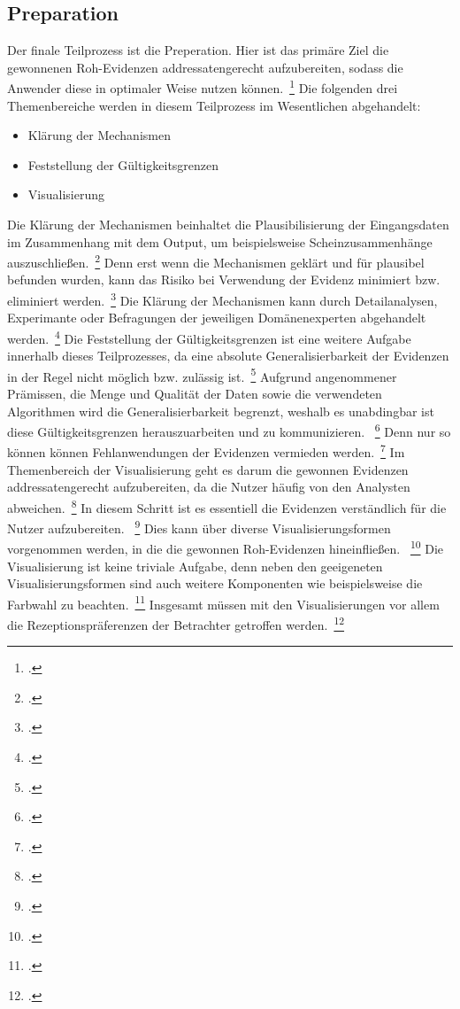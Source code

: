 \subsection{Preparation} \label{sec: t_Preparation}

Der finale Teilprozess ist die Preperation. Hier ist das primäre Ziel die gewonnenen Roh-Evidenzen addressatengerecht
aufzubereiten, sodass die Anwender diese in optimaler Weise nutzen können.~\footcite[\vglf][]{seiter.2019}
Die folgenden drei Themenbereiche werden in diesem Teilprozess im Wesentlichen abgehandelt:
\begin{itemize}
    \item Klärung der Mechanismen
    \item Feststellung der Gültigkeitsgrenzen
    \item Visualisierung
\end{itemize}
Die Klärung der Mechanismen beinhaltet die Plausibilisierung der Eingangsdaten im Zusammenhang mit dem Output, um beispielsweise
Scheinzusammenhänge auszuschließen.~\footcite[\vglf][-32]{seiter.2019}
Denn erst wenn die Mechanismen geklärt und für plausibel befunden wurden, kann das Risiko bei Verwendung der Evidenz
minimiert bzw. eliminiert werden.~\footcite[\vglf][-32]{seiter.2019}
Die Klärung der Mechanismen kann durch Detailanalysen, Experimante oder Befragungen der jeweiligen Domänenexperten
abgehandelt werden.~\footcite[\vglf][]{seiter.2019}
Die Feststellung der Gültigkeitsgrenzen ist eine weitere Aufgabe innerhalb dieses Teilprozesses, da eine absolute
Generalisierbarkeit der Evidenzen in der Regel nicht möglich bzw. zulässig ist.~\footcite[\vglf][]{seiter.2019}
Aufgrund angenommener Prämissen, die Menge und Qualität der Daten sowie die verwendeten Algorithmen wird die
Generalisierbarkeit begrenzt, weshalb es unabdingbar ist diese Gültigkeitsgrenzen herauszuarbeiten und zu kommunizieren.
~\footcite[\vglf][]{seiter.2019}
Denn nur so können können Fehlanwendungen der Evidenzen vermieden werden.~\footcite[\vglf][]{seiter.2019}
Im Themenbereich der Visualisierung geht es darum die gewonnen Evidenzen addressatengerecht aufzubereiten, da die
Nutzer häufig von den Analysten abweichen.~\footcite[\vglf][]{seiter.2019}
In diesem Schritt ist es essentiell die Evidenzen verständlich für die Nutzer aufzubereiten.
~\footcite[\vglf][]{seiter.2019}
Dies kann über diverse Visualisierungsformen vorgenommen werden, in die die gewonnen Roh-Evidenzen hineinfließen.
~\footcite[\vglf][]{seiter.2019}
Die Visualisierung ist keine triviale Aufgabe, denn neben den geeigeneten Visualisierungsformen sind auch weitere Komponenten
wie beispielsweise die Farbwahl zu beachten.~\footcite[\vglf][]{seiter.2019}
Insgesamt müssen mit den Visualisierungen vor allem die Rezeptionspräferenzen der Betrachter getroffen werden.~\footcite
[\vglf][]{seiter.2019}

